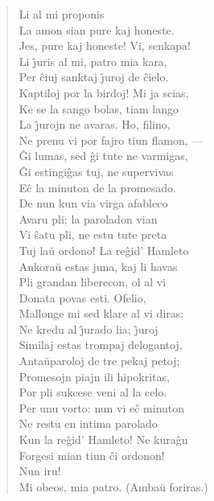\begin{verse}
 Li al mi proponis\\
                La amon sian pure kaj honeste.\\
 Jes, pure kaj honeste! Vi, senkapa!\\
 Li \^{\j}uris al mi, patro mia kara,\\
                Per ĉiuj sanktaj \^{\j}uroj de \^cielo.\\
 Kaptiloj por la birdoj! Mi ja scias,\\
                Ke se la sango bolas, tiam lango\\
                La \^{\j}urojn ne avaras. Ho, filino,\\
                Ne prenu vi por fajro tiun flamon, ---\\
                \^Gi lumas, sed \^gi tute ne varmigas,\\
                \^Gi estingi\^gas tuj, ne supervivas\\
                E\^c la minuton de la promesado.\\
                De nun kun via virga afableco\\
                Avaru pli; la paroladon vian\\
                Vi \^satu pli, ne estu tute preta\\
                Tuj la\u u ordono! La re\^gid' Hamleto\\
                Ankora\u u estas juna, kaj li havas\\
                Pli grandan liberecon, ol al vi\\
                Donata povas esti. Ofelio,\\
                Mallonge mi sed klare al vi diras:\\
                Ne kredu al \^{\j}urado lia; \^{\j}uroj\\
                Similaj estas trompaj delogantoj,\\
                Anta\u uparoloj de tre pekaj petoj;\\
                Promesojn piajn ili hipokritas,\\
                Por pli sukcese veni al la celo.\\
                Per unu vorto: nun vi e\^c minuton\\
                Ne restu en intima parolado\\
                Kun la re\^gid' Hamleto! Ne kura\^gu\\
                Forgesi mian tiun \^ci ordonon!\\
                Nun iru!\\
 Mi obeos, mia patro. {\footnotesize (Amba\u u foriras.)}
\end{verse}

